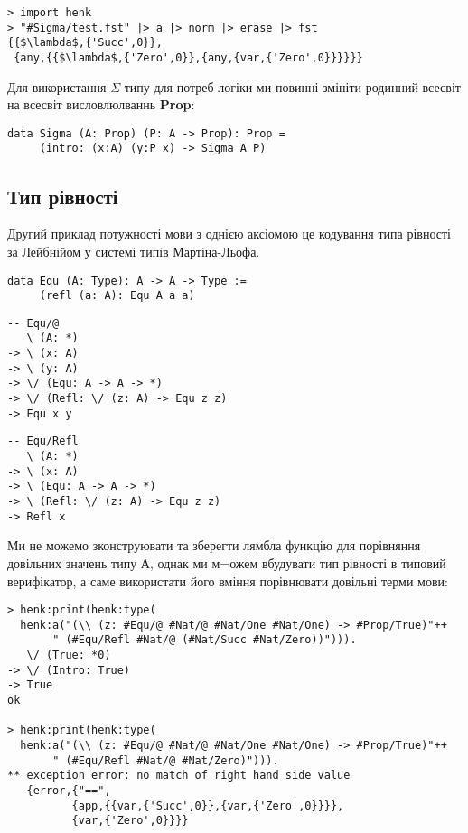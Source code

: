 \documentclass{article}
\begin{document}
\begin{lstlisting}[mathescape=true]
> import henk
> "#Sigma/test.fst" |> a |> norm |> erase |> fst
{{$\lambda$,{'Succ',0}},
 {any,{{$\lambda$,{'Zero',0}},{any,{var,{'Zero',0}}}}}}
\end{lstlisting}

Для використання {\bf $\Sigma$}-типу для потреб логіки ми повинні змініти родинний всесвіт на всесвіт висловлюлваннь {\bf Prop}:

\begin{lstlisting}[mathescape=true]
data Sigma (A: Prop) (P: A -> Prop): Prop =
     (intro: (x:A) (y:P x) -> Sigma A P)
\end{lstlisting}

\subsection{Тип рівності}
Другий приклад потужності мови з однією аксіомою це кодування типа рівності за Лейбнійом
у системі типів Мартіна-Льофа.

\begin{lstlisting}
data Equ (A: Type): A -> A -> Type :=
     (refl (a: A): Equ A a a)
\end{lstlisting}

\begin{lstlisting}
-- Equ/@
   \ (A: *)
-> \ (x: A)
-> \ (y: A)
-> \/ (Equ: A -> A -> *)
-> \/ (Refl: \/ (z: A) -> Equ z z)
-> Equ x y
\end{lstlisting}

\begin{lstlisting}
-- Equ/Refl
   \ (A: *)
-> \ (x: A)
-> \ (Equ: A -> A -> *)
-> \ (Refl: \/ (z: A) -> Equ z z)
-> Refl x
\end{lstlisting}

Ми не можемо зконструювати та зберегти лямбла функцію для порівняння довільних значень типу А,
однак ми м=ожем вбудувати тип рівності в типовий верифікатор, а саме використати його вміння порівнювати довільні терми мови:

\begin{lstlisting}[mathescape=true]
> henk:print(henk:type(
  henk:a("(\\ (z: #Equ/@ #Nat/@ #Nat/One #Nat/One) -> #Prop/True)"++
       " (#Equ/Refl #Nat/@ (#Nat/Succ #Nat/Zero))"))).
   \/ (True: *0)
-> \/ (Intro: True)
-> True
ok

> henk:print(henk:type(
  henk:a("(\\ (z: #Equ/@ #Nat/@ #Nat/One #Nat/One) -> #Prop/True)"++
       " (#Equ/Refl #Nat/@ #Nat/Zero)"))).
** exception error: no match of right hand side value
   {error,{"==",
          {app,{{var,{'Succ',0}},{var,{'Zero',0}}}},
          {var,{'Zero',0}}}}
\end{lstlisting}
\end{document}
